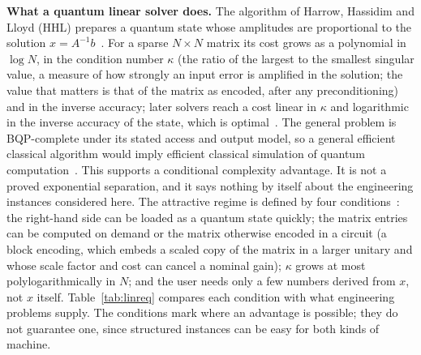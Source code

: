 \textbf{What a quantum linear solver does.} The algorithm of Harrow, Hassidim and Lloyd (HHL) prepares a quantum state whose amplitudes are proportional to the solution $x=A^{-1}b$~\cite{hhl2009}. For a sparse $N\times N$ matrix its cost grows as a polynomial in $\log N$, in the condition number $\kappa$ (the ratio of the largest to the smallest singular value, a measure of how strongly an input error is amplified in the solution; the value that matters is that of the matrix as encoded, after any preconditioning) and in the inverse accuracy; later solvers reach a cost linear in $\kappa$ and logarithmic in the inverse accuracy of the state, which is optimal~\cite{costa2022}. The general problem is BQP-complete under its stated access and output model, so a general efficient classical algorithm would imply efficient classical simulation of quantum computation~\cite{hhl2009}. This supports a conditional complexity advantage. It is not a proved exponential separation, and it says nothing by itself about the engineering instances considered here. The attractive regime is defined by four conditions~\cite{aaronson2015}: the right-hand side can be loaded as a quantum state quickly; the matrix entries can be computed on demand or the matrix otherwise encoded in a circuit (a block encoding, which embeds a scaled copy of the matrix in a larger unitary and whose scale factor and cost can cancel a nominal gain); $\kappa$ grows at most polylogarithmically in $N$; and the user needs only a few numbers derived from $x$, not $x$ itself. Table~\ref{tab:linreq} compares each condition with what engineering problems supply. The conditions mark where an advantage is possible; they do not guarantee one, since structured instances can be easy for both kinds of machine.


